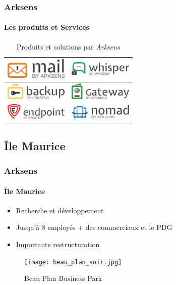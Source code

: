 \documentclass{beamer}
\begin{document}
\begin{frame}
  \frametitle{Arksens}
  \framesubtitle{Les produits et Services}
  \begin{table}[h!]
  \centering
  \def\arraystretch{1.5}
  \setlength{\fboxsep}{13pt} %
  \setlength{\fboxrule}{0pt} %
  \begin{tabular}{cc}
    \arrayrulecolor{gray73}
    \includegraphics[width=3cm, fbox]{produits/mail.png} & 
    \includegraphics[width=3cm, fbox]{produits/whisper.png}\\
    \hline
    \includegraphics[width=3cm, fbox]{produits/backup.png} &
    \includegraphics[width=3cm, fbox]{produits/gateway.png}\\
    \hline
    \includegraphics[width=3cm, fbox]{produits/endpoint.png} &
    \includegraphics[width=3cm, fbox]{produits/nomad.png}\\
  \end{tabular}
  \caption{\label{tabProduits} Produits et solutions par \textit{Arksens}}
\end{table}
\end{frame}

\subsection{\^Ile Maurice}
\begin{frame}
  \frametitle{Arksens}
  \framesubtitle{\^Ile Maurice}
  \begin{minipage}{0.49\linewidth}
    \begin{itemize}
     \item Recherche et d\'eveloppement
     \item Jusqu'\`a 8 employ\'es + des commerciaux et le PDG
     \item Importante restructuration
    \end{itemize}
  \end{minipage}
  \begin{minipage}{0.49\linewidth}
    \begin{figure}[h!]
      \centering
      \texttt{[image: beau\_plan\_soir.jpg]}
      \caption{\label{beauPlan} Beau Plan Business Park}
    \end{figure}
  \end{minipage}

\end{frame}
\end{document}
